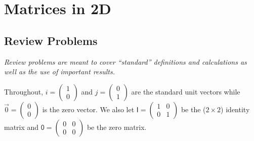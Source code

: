 \section{Matrices in 2D}

\subsection{Review Problems}

\emph{Review problems are meant to cover ``standard'' definitions and calculations as well as the use of important results.}

Throughout, $\unit{i} = \begin{pmatrix} 1 \\ 0 \end{pmatrix}$ and $\unit{j} = \begin{pmatrix} 0 \\ 1 \end{pmatrix}$ are the standard unit vectors while $\vec{0} = \begin{pmatrix} 0 \\ 0 \end{pmatrix}$ is the zero vector. We also let $\mathsf{I} = \begin{pmatrix} 1 & 0 \\ 0 & 1 \end{pmatrix}$ be the ($2\times 2$) identity matrix and $\mathsf{0} = \begin{pmatrix} 0 & 0 \\ 0 & 0 \end{pmatrix}$ be the zero matrix.

